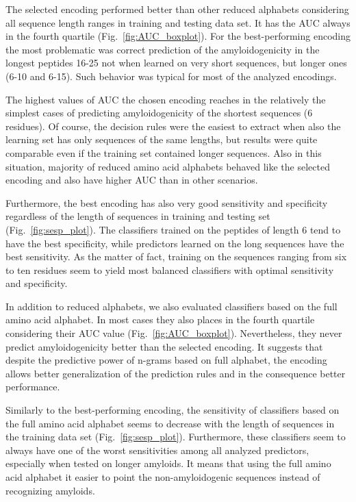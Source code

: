 \documentclass{bioinfo}
\begin{document}
  The selected encoding performed better than other reduced alphabets 
considering all sequence length ranges in training and testing data set. It has 
the AUC always in the fourth quartile (Fig.~\ref{fig:AUC_boxplot}). For the 
best-performing encoding the most problematic was correct prediction of the 
amyloidogenicity in the longest peptides 16-25 not when learned on very short 
sequences, but longer ones (6-10 and 6-15). Such behavior was typical for most 
of the analyzed encodings.

  The highest values of AUC the chosen encoding reaches in the relatively the 
simplest cases of predicting amyloidogenicity of the shortest sequences (6 
residues). Of course, the decision rules were the easiest to extract when also 
the learning set has only sequences of the same lengths, but results were quite 
comparable even if the training set contained longer sequences. Also in this 
situation, majority of reduced amino acid alphabets behaved like the selected 
encoding and also have higher AUC than in other scenarios.

  Furthermore, the best encoding has also very good sensitivity and specificity 
regardless of the length of sequences in training and testing 
set (Fig.~\ref{fig:sesp_plot}). The classifiers trained on the peptides of 
length 6 tend to have the best specificity, while predictors learned on the 
long sequences have the best sensitivity. As the matter of fact, training on 
the sequences ranging from six to ten residues seem to yield most balanced 
classifiers with optimal sensitivity and specificity.

  In addition to reduced alphabets, we also evaluated classifiers based on the 
full amino acid alphabet. In most cases they also places in the fourth quartile 
considering their AUC value (Fig.~\ref{fig:AUC_boxplot}). Nevertheless, they 
never predict amyloidogenicity better than the selected encoding. It suggests 
that despite the predictive power of n-grams based on full alphabet, the 
encoding allows better generalization of the prediction rules and in the 
consequence better performance.

  Similarly to the best-performing encoding, the sensitivity of classifiers 
based on the full amino acid alphabet seems to decrease with the length of 
sequences in the training data set (Fig.~\ref{fig:sesp_plot}). Furthermore, 
these classifiers seem to always have one of the worst sensitivities among all 
analyzed predictors, especially when tested on longer amyloids. It means that 
using the full amino acid alphabet it easier to point the non-amyloidogenic 
sequences instead of recognizing amyloids.
\end{document}
